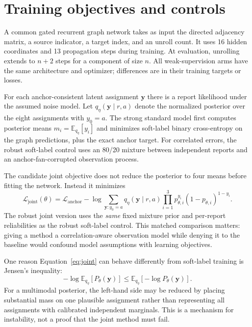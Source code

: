 \documentclass[10pt]{article}
\newcommand{\E}{\mathbb{E}}
\begin{document}
\section{Training objectives and controls}
A common gated recurrent graph network takes as input the directed adjacency matrix, a source indicator, a target index, and an unroll count. It uses 16 hidden coordinates and 13 propagation steps during training. At evaluation, unrolling extends to $n+2$ steps for a component of size $n$. All weak-supervision arms have the same architecture and optimizer; differences are in their training targets or losses.

For each anchor-consistent latent assignment $\mathbf y$ there is a report likelihood under the assumed noise model. Let $q_\eta(\mathbf y\mid r,a)$ denote the normalized posterior over the eight assignments with $y_0=a$. The strong standard model first computes posterior means $m_i=\E_{q_\eta}[y_i]$ and minimizes soft-label binary cross-entropy on the graph predictions, plus the exact anchor target. For correlated errors, the robust soft-label control uses an 80/20 mixture between independent reports and an anchor-fan-corrupted observation process.

The candidate joint objective does not reduce the posterior to four means before fitting the network. Instead it minimizes
\begin{equation}
\mathcal L_{\mathrm{joint}}(\theta)
=\mathcal L_{\mathrm{anchor}}
-\log\!\sum_{\mathbf y:y_0=a}q_\eta(\mathbf y\mid r,a)
  \prod_{i=1}^{3}p_{\theta,i}^{y_i}(1-p_{\theta,i})^{1-y_i}.
\label{eq:joint}
\end{equation}
The robust joint version uses the \emph{same} fixed mixture prior and per-report reliabilities as the robust soft-label control. This matched comparison matters: giving a method a correlation-aware observation model while denying it to the baseline would confound model assumptions with learning objectives.

One reason Equation~\ref{eq:joint} can behave differently from soft-label training is Jensen's inequality:
\begin{equation}
-\log\E_{q_\eta}[P_\theta(\mathbf y)]\leq
\E_{q_\eta}[-\log P_\theta(\mathbf y)].
\label{eq:jensen}
\end{equation}
For a multimodal posterior, the left-hand side may be reduced by placing substantial mass on one plausible assignment rather than representing all assignments with calibrated independent marginals. This is a mechanism for instability, not a proof that the joint method must fail.
\end{document}
